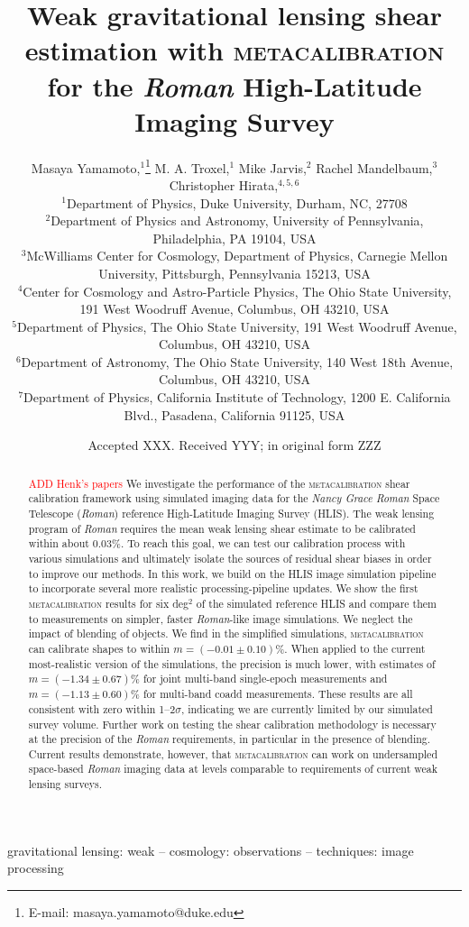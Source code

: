 \documentclass[fleqn,usenatbib]{mnras}
\title[Metacalibration for the Roman HLIS]{Weak gravitational lensing shear estimation with \textsc{metacalibration} for the \emph{Roman} High-Latitude Imaging Survey}
\author[M. Yamamoto et al.]{
Masaya Yamamoto,$^{1}$\thanks{E-mail: masaya.yamamoto@duke.edu}
M. A. Troxel,$^{1}$
Mike Jarvis,$^{2}$
Rachel Mandelbaum,$^{3}$
Christopher Hirata,$^{4,5,6}$
\newauthor{
Heyang Long,$^{4,5}$ Ami Choi,$^{7}$
and Tianqing Zhang$^{3}$}\\
$^{1}$Department of Physics, Duke University, Durham, NC, 27708\\
$^{2}$Department of Physics and Astronomy, University of Pennsylvania, Philadelphia, PA 19104, USA\\
$^{3}$McWilliams Center for Cosmology, Department of Physics, Carnegie Mellon University, Pittsburgh, Pennsylvania 15213, USA\\
$^{4}$Center for Cosmology and Astro-Particle Physics, The Ohio State University, 191 West Woodruff Avenue, Columbus, OH 43210, USA\\
$^{5}$Department of Physics, The Ohio State University, 191 West Woodruff Avenue, Columbus, OH 43210, USA\\
$^{6}$Department of Astronomy, The Ohio State University, 140 West 18th Avenue, Columbus, OH 43210, USA\\
$^{7}$Department of Physics, California Institute of Technology, 1200 E. California Blvd., Pasadena, California 91125, USA\\
}
\date{Accepted XXX. Received YYY; in original form ZZZ}
\begin{document}
\label{firstpage}
\pagerange{\pageref{firstpage}--\pageref{lastpage}}
\maketitle

\begin{abstract}
\textcolor{red}{ADD Henk's papers}
We investigate the performance of the \textsc{metacalibration} shear calibration framework using simulated imaging data for the \emph{Nancy Grace Roman} Space Telescope (\emph{Roman}) reference High-Latitude Imaging Survey (HLIS). The weak lensing program of \emph{Roman} requires the mean weak lensing shear estimate to be calibrated within about 0.03\%. To reach this goal, we can test our calibration process with various simulations and ultimately isolate the sources of residual shear biases in order to improve our methods. In this work, we build on the HLIS image simulation pipeline to incorporate several more realistic processing-pipeline updates. We show the first \textsc{metacalibration} results for six \textrm{deg}$^2$ of the simulated reference HLIS and compare them to measurements on simpler, faster \emph{Roman}-like image simulations. We neglect the impact of blending of objects. We find in the simplified simulations, \textsc{metacalibration} can calibrate shapes to within $m=(-0.01\pm 0.10)$\%. When applied to the current most-realistic version of the simulations, the precision is much lower, with estimates of $m=(-1.34\pm 0.67)$\% for joint multi-band single-epoch measurements and $m=(-1.13\pm 0.60)$\% for multi-band coadd measurements. These results are all consistent with zero within 1--2$\sigma$, indicating we are currently limited by our simulated survey volume. Further work on testing the shear calibration methodology is necessary at the precision of the \emph{Roman} requirements, in particular in the presence of blending. Current results demonstrate, however, that \textsc{metacalibration} can work on undersampled space-based \emph{Roman} imaging data at levels comparable to requirements of current weak lensing surveys.
\end{abstract}

\begin{keywords}
gravitational lensing: weak -- cosmology: observations -- techniques: image processing
\end{keywords}


\end{document}
